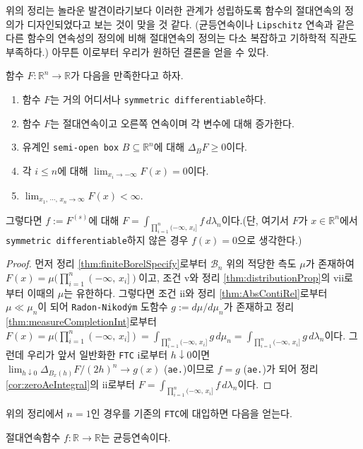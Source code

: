 위의 정리는 놀라운 발견이라기보다 이러한 관계가 성립하도록 함수의 절대연속의 정의가 디자인되었다고 보는 것이 맞을 것 같다. (균등연속이나 \texttt{Lipschitz} 연속과 같은 다른 함수의 연속성의 정의에 비해 절대연속의 정의는 다소 복잡하고 기하학적 직관도 부족하다.) 아무튼 이로부터 우리가 원하던 결론을 얻을 수 있다.

\begin{theorem}\label{thm:FTC2}
    함수 $F:\mathbb{R}^n\to\mathbb{R}$가 다음을 만족한다고 하자.
    \begin{enumerate}
        \item 함수 $F$는 거의 어디서나 \texttt{symmetric differentiable}하다.
        \item 함수 $F$는 절대연속이고 오른쪽 연속이며 각 변수에 대해 증가한다.
        \item 유계인 \texttt{semi-open box} $B\subseteq\mathbb{R}^n$에 대해 $\Delta_BF\geq0$이다.
        \item 각 $i\leq n$에 대해 $\lim_{x_i\to-\infty}F(x)=0$이다.
        \item $\lim_{x_1,\,\cdots,\,x_n\to\infty}F(x)<\infty$.
    \end{enumerate}
    그렇다면 $f:=F^{(s)}$에 대해 $F=\int_{\prod_{i=1}^n(-\infty,\,x_i]}f\,d\lambda_n$이다.(단, 여기서 $F$가 $x\in\mathbb{R}^n$에서 \texttt{symmetric differentiable}하지 않은 경우 $f(x)=0$으로 생각한다.)
\end{theorem}

\begin{proof}
    먼저 정리 \ref{thm:finiteBorelSpecify}로부터 $\mathcal{B}_n$ 위의 적당한 측도 $\mu$가 존재하여 $F(x)=\mu(\prod_{i=1}^n(-\infty,\,x_i])$이고, 조건 v와 정리 \ref{thm:distributionProp}의 vii로부터 이때의 $\mu$는 유한하다. 그렇다면 조건 ii와 정리 \ref{thm:AbsContiRel}로부터 $\mu\ll\mu_n$이 되어 \texttt{Radon-Nikod\'ym} 도함수 $g:=d\mu/d\mu_n$가 존재하고 정리 \ref{thm:measureCompletionInt}로부터 $F(x)=\mu(\prod_{i=1}^n(-\infty,\,x_i])=\int_{\prod_{i=1}^n(-\infty,\,x_i]}g\,d\mu_n=\int_{\prod_{i=1}^n(-\infty,\,x_i]}g\,d\lambda_n$이다. 그런데 우리가 앞서 일반화한 \texttt{FTC} i로부터 $h\downarrow0$이면 $\lim_{h\downarrow0}\Delta_{B_x(h)}F/(2h)^n\to g(x)$ (\texttt{ae.})이므로 $f=g$ (\texttt{ae.})가 되어 정리 \ref{cor:zeroAeIntegral}의 ii로부터 $F=\int_{\prod_{i=1}^n(-\infty,\,x_i]}f\,d\lambda_n$이다.
\end{proof}

위의 정리에서 $n=1$인 경우를 기존의 \texttt{FTC}에 대입하면 다음을 얻는다.

\begin{proposition}
    절대연속함수 $f:\mathbb{R}\to\mathbb{R}$는 균등연속이다.
\end{proposition}


